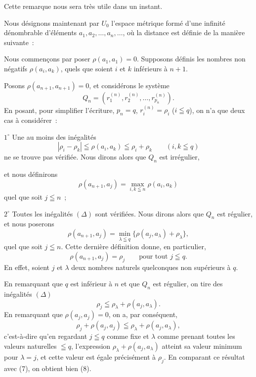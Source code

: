 \documentclass[a4paper,12pt]{amsart}
\newcommand{\srcpage}[1]{} %
\begin{document}
Cette remarque nous sera très utile dans un instant.

Nous désignons maintenant par $U_0$ l'espace métrique formé d'une infinité dénombrable d'éléments $a_1,a_2,\dots,a_n,\dots$, où la distance est définie de la manière suivante~:

Nous commençons par poser $\rho(a_1,a_1)=0$. Supposons définis les nombres non négatifs $\rho(a_i,a_k)$, quels que soient $i$ et $k$ inférieurs à $n+1$.

Posons $\rho(a_{n+1},a_{n+1})=0$, et considérons le système
\begin{equation}\tag{4}
Q_n=(r_1^{(n)},r_2^{(n)},\dots,r_{p_n}^{(n)}).
\end{equation}
En posant, pour simplifier l'écriture, $p_n=q$, $r_i^{(n)}=\rho_i$ ($i\leqq q$), on n'a que deux cas à considérer~:

$1^\circ$ Une au moins des inégalités
\begin{equation}\tag{$\Delta$}
|\rho_i-\rho_k|\leqq\rho(a_i,a_k)\leqq\rho_i+\rho_k
\qquad(i,k\leqq q)
\end{equation}
ne se trouve pas vérifiée. Nous dirons alors que $Q_n$ est irrégulier,
\srcpage{54}
et nous définirons
\begin{equation}\tag{6}
\rho(a_{n+1},a_j)=\max_{i,k\leqq n}\rho(a_i,a_k)
\end{equation}
quel que soit $j\leqq n$~;

$2^\circ$ Toutes les inégalités $(\Delta)$ sont vérifiées. Nous dirons alors que $Q_n$ est régulier, et nous poserons
\begin{equation}\tag{7}
\rho(a_{n+1},a_j)=\min_{\lambda\leqq q}\{\rho(a_j,a_\lambda)+\rho_\lambda\},
\end{equation}
quel que soit $j\leqq n$. Cette dernière définition donne, en particulier,
\begin{equation}\tag{8}
\rho(a_{n+1},a_j)=\rho_j\qquad\text{pour tout }j\leqq q.
\end{equation}
En effet, soient $j$ et $\lambda$ deux nombres naturels quelconques non supérieurs à $q$.

En remarquant que $q$ est inférieur à $n$ et que $Q_n$ est régulier, on tire des inégalités $(\Delta)$
\begin{equation}\tag{9}
\rho_j\leqq\rho_\lambda+\rho(a_j,a_\lambda).
\end{equation}
En remarquant que $\rho(a_j,a_j)=0$, on a, par conséquent,
\begin{equation}\tag{9 bis}
\rho_j+\rho(a_j,a_j)\leqq\rho_\lambda+\rho(a_j,a_\lambda),
\end{equation}
c'est-à-dire qu'en regardant $j\leqq q$ comme fixe et $\lambda$ comme prenant toutes les valeurs naturelles $\leqq q$, l'expression $\rho_\lambda+\rho(a_j,a_\lambda)$ atteint sa valeur minimum pour $\lambda=j$, et cette valeur est égale précisément à $\rho_j$. En comparant ce résultat avec (7), on obtient bien (8).
\end{document}
